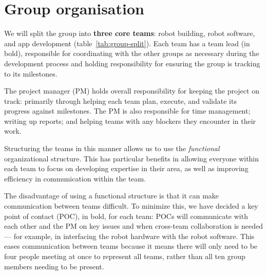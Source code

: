 \documentclass{article}
\begin{document}
\section{Group organisation}
\begin{table}[]
  \caption{Team splits across the group. Names in bold are key points of contact.}
  \label{tab:group-split}
\end{table}

We will split the group into {\bf three core teams}: robot building, robot software, and app development (table~\ref{tab:group-split}). Each team has a team lead (in bold), responsible for coordinating with the other groups as necessary during the development process and holding responsibility for ensuring the group is tracking to its milestones.

The project manager (PM) holds overall responsibility for keeping the project on track: primarily through helping each team plan, execute, and validate its progress against milestones. The PM is also responsible for time management; writing up reports; and helping teams with any blockers they encounter in their work.

Structuring the teams in this manner allows us to use the {\it functional} organizational structure. This has particular benefits in allowing everyone within each team to focus on developing expertise in their area, as well as improving efficiency in communication within the team.

The disadvantage of using a functional structure is that it can make communication between teams difficult. To minimize this, we have decided a key point of contact (POC), in bold, for each team: POCs will communicate with each other and the PM on key issues and when cross-team collaboration is needed --- for example, in interfacing the robot hardware with the robot software. This eases communication between teams because it means there will only need to be four people meeting at once to represent all teams, rather than all ten group members needing to be present.
\end{document}

